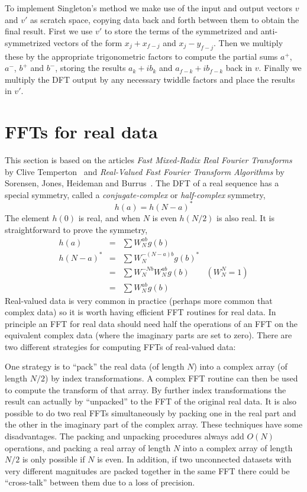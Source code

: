 \documentclass[fleqn,12pt]{article}
\begin{document}
To implement Singleton's method we make use of the input and output
vectors $v$ and $v'$ as scratch space, copying data back and forth
between them to obtain the final result.  First we use $v'$ to store
the terms of the symmetrized and anti-symmetrized vectors of the form
$x_j + x_{f-j}$ and $x_j - y_{f-j}$. Then we multiply these by the
appropriate trigonometric factors to compute the partial sums $a^+$,
$a^-$, $b^+$ and $b^-$, storing the results $a_k + i b_k$ and $a_{f-k}
+ i b_{f-k}$ back in $v$. Finally we multiply the DFT output by any
necessary twiddle factors and place the results in $v'$.

\section{FFTs for real data}
%
This section is based on the articles {\em Fast Mixed-Radix Real
  Fourier Transforms} by Clive Temperton~\cite{temperton83real} and
{\em Real-Valued Fast Fourier Transform Algorithms} by Sorensen,
Jones, Heideman and Burrus~\cite{burrus87real}. The DFT of a real
sequence has a special symmetry, called a {\em conjugate-complex} or
{\em half-complex} symmetry,
%
\begin{equation}
h(a) = h(N-a)^*
\end{equation}
%
The element $h(0)$ is real, and when $N$ is even $h(N/2)$ is also
real. It is straightforward to prove the symmetry,
%
\begin{eqnarray}
h(a) &=& \sum W^{ab}_N g(b) \\
h(N-a)^* &=& \sum W^{-(N-a)b}_N g(b)^*  \\
         &=& \sum W^{-Nb}_N W^{ab}_N g(b) \qquad{(W^N_N=1)} \\
         &=& \sum W^{ab}_N g(b)
\end{eqnarray}
%
Real-valued data is very common in practice (perhaps more common that
complex data) so it is worth having efficient FFT routines for real
data. In principle an FFT for real data should need half the
operations of an FFT on the equivalent complex data (where the
imaginary parts are set to zero). There are two different strategies
for computing FFTs of real-valued data:

One strategy is to ``pack'' the real data (of length $N$) into a
complex array (of length $N/2$) by index transformations. A complex
FFT routine can then be used to compute the transform of that array.
By further index transformations the result can actually by
``unpacked'' to the FFT of the original real data. It is also possible
to do two real FFTs simultaneously by packing one in the real part and
the other in the imaginary part of the complex array.  These
techniques have some disadvantages. The packing and unpacking
procedures always add $O(N)$ operations, and packing a real array of
length $N$ into a complex array of length $N/2$ is only possible if
$N$ is even. In addition, if two unconnected datasets with very
different magnitudes are packed together in the same FFT there could
be ``cross-talk'' between them due to a loss of precision.
\end{document}
